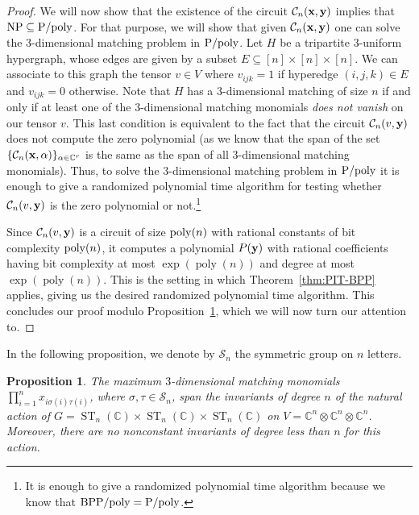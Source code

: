 \documentclass[10pt,a4paper]{article}
\newtheorem{proposition}[theorem]{Proposition}
\newcommand{\C}{\mathbb C}
\newcommand{\ST}{\operatorname{ST}}
\newcommand{\cC}{\mathcal C}
\newcommand{\bx}{\textbf x}
\newcommand{\by}{\textbf y}
\newcommand{\poly}{\operatorname{poly}}
\begin{document}
\begin{proof}
	We will now show that the existence of the circuit $\cC_n(\bx, \by)$ implies that
	${\rm NP\subseteq P/poly}$. For that purpose, we will show that given $\cC_n(\bx, \by)$ one can
	solve the $3$-dimensional matching problem in ${\rm P/poly}$.
	Let $H$ be a tripartite 3-uniform hypergraph, whose edges are given by a subset
	$E \subseteq [n] \times [n] \times [n]$.
	We can associate to this graph the tensor $v \in V$ where
	$v_{ijk} = 1$ if hyperedge $(i,j,k) \in E$ and $v_{ijk} = 0$ otherwise.
	Note that $H$ has a $3$-dimensional matching of size $n$ if and only if at least one
	of the $3$-dimensional matching monomials \emph{does not vanish} on our tensor $v$.
	This last
	condition is equivalent to the fact that the circuit $\cC_n(v, \by)$ does not compute the
	zero polynomial (as we know that the span of the set $\{\cC_n(\bx, \alpha)\}_{\alpha \in \C^r}$
	is the same as the span of all $3$-dimensional matching monomials).
	Thus, to solve the $3$-dimensional
	matching problem in ${\rm P/poly}$ it is enough to give a randomized polynomial time algorithm
	for testing whether $\cC_n(v, \by)$ is the zero polynomial or not.\footnote{It is enough to
	give a randomized polynomial time algorithm because we know that ${\rm BPP/poly = P/poly}$.}

	Since $\cC_n(v, \by)$ is a circuit of size ${\rm poly}(n)$ with rational constants of bit
	complexity ${\rm poly}(n)$, it computes a polynomial $P(\by)$ with rational coefficients
	having bit complexity at most $\exp(\poly(n))$ and degree at most $\exp(\poly(n))$.
  This is the setting in which
	Theorem~\ref{thm:PIT-BPP} applies, giving us the desired randomized polynomial
	time algorithm. This concludes our proof modulo Proposition~\ref{prop:least-degree-torus},
	which we will now turn our attention to.
\end{proof}



%
%
%
%

%
%
%
%
%
%

%
%
%
%
%
%
%
%

\noindent
In the following proposition, we denote by $\mathcal{S}_n$ the symmetric group on $n$ letters.


\begin{proposition}\label{prop:least-degree-torus}
	The maximum $3$-dimensional matching monomials  $\prod_{i=1}^n x_{i \sigma(i) \tau(i)}$,
	where $\sigma, \tau \in \mathcal{S}_n$, span the invariants of degree
	$n$ of the natural action of $G = \ST_n(\C) \times \ST_n(\C) \times \ST_n(\C)$
	on $V = \C^n \otimes \C^n \otimes \C^n$. Moreover, there are no nonconstant invariants of degree less than $n$ for this action.
\end{proposition}
\end{document}
